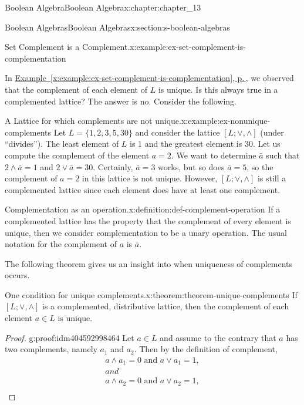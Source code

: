 \documentclass[twoside,10pt,]{book}
\newcommand{\xreffont}{\relax}
\numberwithin{equation}{section}
\begin{document}
\begin{chapterptx}{Boolean Algebra}{}{Boolean Algebra}{}{}{x:chapter:chapter_13}
\begin{sectionptx}{Boolean Algebras}{}{Boolean Algebras}{}{}{x:section:s-boolean-algebras}
\begin{example}{Set Complement is a Complement.}{x:example:ex-set-complement-is-complementation}
\end{example}
In \hyperref[x:example:ex-set-complement-is-complementation]{Example~{\xreffont\ref{x:example:ex-set-complement-is-complementation}}, p.\,\pageref{x:example:ex-set-complement-is-complementation}}, we observed that the complement of each element of \(L\) is unique. Is this always true in a complemented lattice? The answer is no. Consider the following.%
\begin{example}{A Lattice for which complements are not unique.}{x:example:ex-nonunique-complements}%
Let \(L = \{1, 2, 3, 5, 30\}\) and consider the lattice \([L; \lor, \land ]\) (under ``divides''). The least element of \(L\) is 1 and the greatest element is 30. Let us compute the complement of the element \(a = 2\). We want to determine \(\bar{a}\) such that \(2 \land  \bar{a} = 1\) and \(2 \lor  \bar{a} = 30\). Certainly, \(\bar{a} = 3\) works, but so does \(\bar{a} = 5\), so the complement of \(a
= 2\) in this lattice is not unique. However, \([L; \lor  , \land ]\) is still a complemented lattice since each element does have at least one complement.%
\end{example}
\begin{definition}{Complementation as an operation.}{x:definition:def-complement-operation}%
%
\label{g:notation:idm404593004160}%
If a complemented lattice  has the property that the complement of every element is unique, then we consider complementation to be a unary operation.  The usual notation for the complement of \(a\) is \(\bar{a}\).%
\end{definition}
The following theorem gives us an insight into when uniqueness of complements occurs.%
\begin{theorem}{One condition for unique complements.}{}{x:theorem:theorem-unique-complements}%
If \([L; \lor ,\land ]\) is a complemented, distributive lattice, then the complement of each element \(a \in L\) is unique.%
\end{theorem}
\begin{proof}{}{g:proof:idm404592998464}
Let \(a \in  L\) and assume to the contrary that \(a\) has two complements, namely \(a_1\) and \(a_2\). Then by the definition of complement,%
\begin{equation*}
\begin{array}{c}
a \land  a_1 = 0\textrm{ and }a \lor  a_1 = 1, \\ 
and\\
a \land  a_2 = 0\textrm{ and }a \lor  a_2 = 1, \\

\end{array}
\end{equation*}
\end{proof}
\end{sectionptx}
\end{chapterptx}
\end{document}
